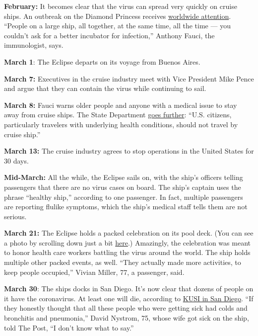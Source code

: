 \textbf{February:} It becomes clear that the virus can spread very
quickly on cruise ships. An outbreak on the Diamond Princess receives
\href{https://www.nytimes.com/2020/02/22/world/asia/coronavirus-japan-cruise-ship.html}{worldwide
attention}. ``People on a large ship, all together, at the same time,
all the time --- you couldn't ask for a better incubator for
infection,'' Anthony Fauci, the immunologist, says.

\textbf{March 1}: The Eclipse departs on its voyage from Buenos Aires.

\textbf{March 7:} Executives in the cruise industry meet with Vice
President Mike Pence and argue that they can contain the virus while
continuing to sail.

\textbf{March 8:} Fauci warns older people and anyone with a medical
issue to stay away from cruise ships. The State Department
\href{https://travel.state.gov/content/travel/en/international-travel/before-you-go/travelers-with-special-considerations/cruise-ship-passengers.html?fbclid=IwAR23mRlu4-382HLuSM8i0KWQBSaZ4heDniggmxR3kBR6e2EgWiKr6B0EseM\#.XmVnwRnDlCU.twitter}{goes
further}: ``U.S. citizens, particularly travelers with underlying health
conditions, should not travel by cruise ship.''

\textbf{March 13:} The cruise industry agrees to stop operations in the
United States for 30 days.

\textbf{Mid-March:} All the while, the Eclipse sails on, with the ship's
officers telling passengers that there are no virus cases on board. The
ship's captain uses the phrase ``healthy ship,'' according to one
passenger. In fact, multiple passengers are reporting flulike symptoms,
which the ship's medical staff tells them are not serious.

\textbf{March 21:} The Eclipse holds a packed celebration on its pool
deck. (You can see a photo by scrolling down just a bit
\href{https://www.washingtonpost.com/graphics/2020/politics/cruise-ships-coronavirus/?nid=top_pb_signin}{here}.)
Amazingly, the celebration was meant to honor health care workers
battling the virus around the world. The ship holds multiple other
packed events, as well. ``They actually made more activities, to keep
people occupied,'' Vivian Miller, 77, a passenger, said.

\textbf{March 30}: The ships docks in San Diego. It's now clear that
dozens of people on it have the coronavirus. At least one will die,
according to
\href{https://www.kusi.com/sister-of-celebrity-cruise-ship-eclipse-passenger-who-died-from-covid-19-speaks-about-how-it-was-handled/}{KUSI
in San Diego}. ``If they honestly thought that all these people who were
getting sick had colds and bronchitis and pneumonia,'' David Nystrom,
75, whose wife got sick on the ship, told The Post, ``I don't know what
to say.''

